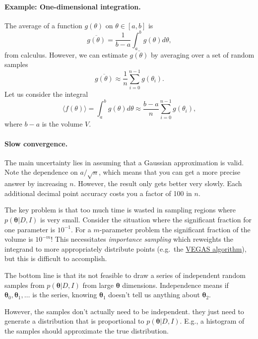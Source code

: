 \documentclass[%
oneside,                 %
final,                   %
10pt]{article}
\begin{document}
\paragraph{Example: One-dimensional integration.}
The average of a function $g(\theta)$ on $\theta \in [a,b]$ is
\[
\overline{g(\theta)} = \frac{1}{b-a} \int_a^b g(\theta) d\theta,
\]
from calculus. However, we can estimate $\bar{g(\theta)}$ by averaging over a set of random samples
\[
\overline{g(\theta)} \approx \frac{1}{n} \sum_{i=0}^{n-1} g(\theta_i).
\]
Let us consider the integral
\[
\langle f(\theta) \rangle = \int_a^b g(\theta) d\theta \approx 
\frac{b-a}{n} \sum_{i=0}^{n-1} g(\theta_i),
\]
where $b-a$ is the volume $V$.

\paragraph{Slow convergence.}
The main uncertainty lies in assuming that a Gaussian approximation is valid. Note the dependence on $a/\sqrt{n}$, which means that you can get a more precise answer by increasing $n$. However, the result only gets better very slowly. Each additional decimal point accuracy costs you a factor of 100 in $n$.

The key problem is that too much time is wasted in sampling regions where $p( \boldsymbol{\theta} |D,I )$ is very small. Consider the situation where the significant fraction for one parameter is $10^{-1}$. For a $m$-parameter problem the significant fraction of the volume is $10^{-m}$! This necessitates \emph{importance sampling} which reweights the integrand to more appropriately distribute points (e.g.~the \href{{https://en.wikipedia.org/wiki/VEGAS_algorithm}}{VEGAS algorithm}), but this is difficult to accomplish.

The bottom line is that its not feasible to draw a series of independent random samples from $p ( \boldsymbol{\theta} | D,I )$ from large $\boldsymbol{\theta}$ dimensions. Independence means if $\boldsymbol{\theta}_0, \boldsymbol{\theta}_1, \ldots$ is the series, knowing $\boldsymbol{\theta}_1$ doesn't tell us anything about $\boldsymbol{\theta}_2$.

However, the samples don't actually need to be independent. they just need to generate a distribution that is proportional to $p ( \boldsymbol{\theta} |D,I)$. E.g., a histogram of the samples should approximate the true distribution.

\end{document}
